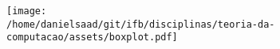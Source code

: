 \documentclass{article}
\begin{document}
\begin{figure}[h!]
\centering\begin{subfigure}
        \centering
        \texttt{[image: /home/danielsaad/git/ifb/disciplinas/teoria-da-computacao/assets/boxplot.pdf]}
    \end{subfigure}\end{figure}
\end{document}
